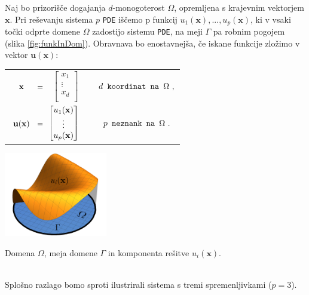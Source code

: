 \documentclass[11pt,a4paper,notitlepage]{article}%
\begin{document}
	Naj bo prizorišče dogajanja $d$-monogoterost $\Omega$, opremljena s krajevnim vektorjem $\mathbf{x}$. Pri reševanju sistema $p$ \texttt{PDE} iščemo p funkcij $u_1(\mathbf{x}), ..., u_p(\mathbf{x})$, ki v vsaki točki odprte domene $\Omega$ zadostijo sistemu \texttt{PDE}, na meji $\Gamma$ pa robnim pogojem (slika \ref{fig:funkInDom}). Obravnava bo enostavnejša, če iskane funkcije zložimo v vektor $\mathbf{u}(\mathbf{x})$:\\[0.5cm]
	\begin{tabular}{m{3mm} m{3.5mm} m{1mm} p{1cm} m{4.5cm}}
		& $\hspace{0.5mm}\mathbf{x}$ & $\hspace{-0.9mm}=$ & $\begin{bmatrix}
			x_1 \\
			\vdots \\
			x_d \\
		\end{bmatrix}$ & $\hspace{0.4cm} d \texttt{ koordinat na }\Omega \ ,$
		\\[1.2cm]
		& $\hspace{-2mm}\mathbf{u}(\mathbf{x})$ & $\hspace{-0.9mm}=$ & $\hspace{-2mm}\begin{bmatrix}
			u_1(\mathbf{x}) \\
			\vdots \\
			u_p(\mathbf{x})
		\end{bmatrix}$ & $\hspace{0.6cm} p \texttt{ neznank na } \Omega \ .$
	\end{tabular}
	\begin{minipage}[c]{0.48\textwidth}
    \centering
    \captionsetup{type=figure}
    \includegraphics[height=3.7cm]{Slike/funkcijaInDomenaG}
    \caption{Domena $\Omega$, meja domene $\Gamma$ in komponenta rešitve $u_i(\mathbf{x})$.}
    \label{fig:funkInDom}
\end{minipage}\\[0.5cm]
	Splošno razlago bomo sproti ilustrirali sistema s tremi spremenljivkami ($p = 3$). \\[0cm]
	
\end{document}
